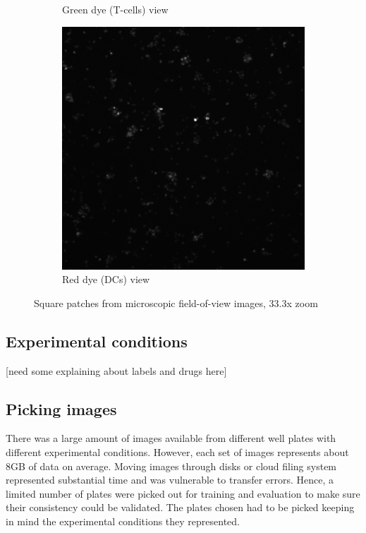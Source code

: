 \begin{figure}[h]
\begin{subfigure}[h!]{0.3\textwidth}
        \caption{Green dye (T-cells) view}
        \label{fig:fov_fitc}
    \end{subfigure}
    \begin{subfigure}[h!]{0.3\textwidth}
        \includegraphics[width=\textwidth]{dissertation/figures/example_TexasRed.png}
        \caption{Red dye (DCs) view}
        \label{fig:fov_tr}
    \end{subfigure}
    \caption{Square patches from microscopic field-of-view images, 33.3x zoom}
    \label{fig:fov}
\end{figure}

\subsection{Experimental conditions}

[need some explaining about labels and drugs here]

\subsection{Picking images}

There was a large amount of images available from different well plates with different experimental conditions. However, each set of images represents about 8GB of data on average. Moving images through disks or cloud filing system represented substantial time and was vulnerable to transfer errors. Hence, a limited number of plates were picked out for training and evaluation to make sure their consistency could be validated. The plates chosen had to be picked keeping in mind the experimental conditions they represented.


